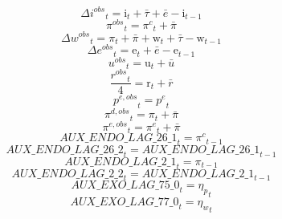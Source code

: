 \begin{dmath}
{{\Delta i^{obs}}}_{t}={{\mathrm{i}}}_{t}+{{\bar{\tau}}}+{{\bar{e}}}-{{\mathrm{i}}}_{t-1}
\end{dmath}
\begin{dmath}
{{\pi^{obs}}}_{t}={{\pi^{c}}}_{t}+{{\bar{\pi}}}
\end{dmath}
\begin{dmath}
{{\Delta w^{obs}}}_{t}={{\pi}}_{t}+{{\bar{\pi}}}+{{\mathrm{w}}}_{t}+{{\bar{\tau}}}-{{\mathrm{w}}}_{t-1}
\end{dmath}
\begin{dmath}
{{\Delta e^{obs}}}_{t}={{\mathrm{e}}}_{t}+{{\bar{e}}}-{{\mathrm{e}}}_{t-1}
\end{dmath}
\begin{dmath}
{{u^{obs}}}_{t}={{\mathrm{u}}}_{t}+{{\bar{u}}}
\end{dmath}
\begin{dmath}
\frac{{{r^{obs}}}_{t}}{4}={{\mathrm{r}}}_{t}+{{\bar{r}}}
\end{dmath}
\begin{dmath}
{{p^{e,obs}}}_{t}={{p^{e}}}_{t}
\end{dmath}
\begin{dmath}
{{\pi^{d,obs}}}_{t}={{\pi}}_{t}+{{\bar{\pi}}}
\end{dmath}
\begin{dmath}
{{\pi^{e,obs}}}_{t}={{\pi^{e}}}_{t}+{{\bar{\pi}}}
\end{dmath}
\begin{dmath}
{AUX\_ENDO\_LAG\_26\_1}_{t}={{\pi^{c}}}_{t-1}
\end{dmath}
\begin{dmath}
{AUX\_ENDO\_LAG\_26\_2}_{t}={AUX\_ENDO\_LAG\_26\_1}_{t-1}
\end{dmath}
\begin{dmath}
{AUX\_ENDO\_LAG\_2\_1}_{t}={{\pi}}_{t-1}
\end{dmath}
\begin{dmath}
{AUX\_ENDO\_LAG\_2\_2}_{t}={AUX\_ENDO\_LAG\_2\_1}_{t-1}
\end{dmath}
\begin{dmath}
{AUX\_EXO\_LAG\_75\_0}_{t}={{\eta_{p}}}_{t}
\end{dmath}
\begin{dmath}
{AUX\_EXO\_LAG\_77\_0}_{t}={{\eta_{w}}}_{t}
\end{dmath}
